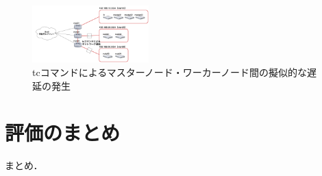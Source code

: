 \begin{figure}[htbp]
  \begin{center}
    \includegraphics[width=0.4\textwidth]{./figures/tc.png}
    \caption{tcコマンドによるマスターノード・ワーカーノード間の擬似的な遅延の発生}
  \end{center}
\end{figure}



\section{評価のまとめ}

まとめ．

